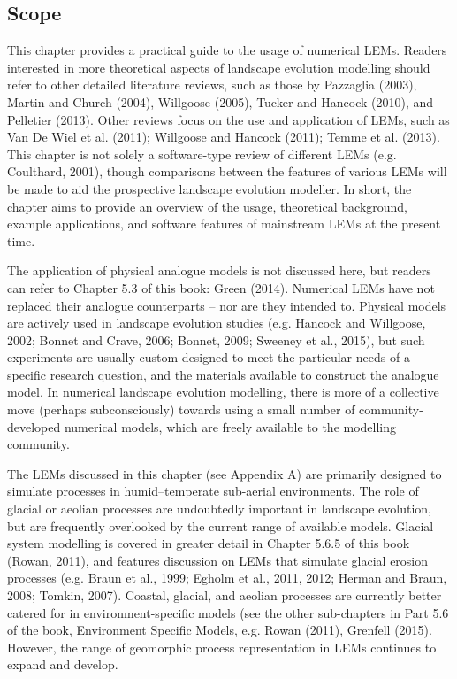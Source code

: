 \subsection[Scope]{Scope}
This chapter provides a practical guide to the usage of numerical LEMs. Readers interested in more theoretical aspects of landscape evolution modelling should refer to other detailed literature reviews, such as those by Pazzaglia (2003), Martin and Church (2004), Willgoose (2005), Tucker and Hancock (2010), and Pelletier (2013). Other reviews focus on the use and application of LEMs, such as Van De Wiel et al. (2011); Willgoose and Hancock (2011); Temme et al. (2013). This chapter is not solely a software-type review of different LEMs (e.g. Coulthard, 2001), though comparisons between the features of various LEMs will be made to aid the prospective landscape evolution modeller. In short, the chapter aims to provide an overview of the usage, theoretical background, example applications, and software features of mainstream LEMs at the present time.

The application of physical analogue models is not discussed here, but readers can refer to Chapter 5.3 of this book: Green (2014). Numerical LEMs have not replaced their analogue counterparts – nor are they intended to. Physical models are actively used in landscape evolution studies (e.g. Hancock and Willgoose, 2002; Bonnet and Crave, 2006; Bonnet, 2009; Sweeney et al., 2015), but such experiments are usually custom-designed to meet the particular needs of a specific research question, and the materials available to construct the analogue model. In numerical landscape evolution modelling, there is more of a collective move (perhaps subconsciously) towards using a small number of community-developed numerical models, which are freely available to the modelling community.

The LEMs discussed in this chapter (see Appendix A) are primarily designed to simulate processes in humid–temperate sub-aerial environments. The role of glacial or aeolian processes are undoubtedly important in landscape evolution, but are frequently overlooked by the current range of available models. Glacial system modelling is covered in greater detail in Chapter 5.6.5 of this book (Rowan, 2011), and features discussion on LEMs that simulate glacial erosion processes (e.g. Braun et al., 1999; Egholm et al., 2011, 2012; Herman and Braun, 2008; Tomkin, 2007). Coastal, glacial, and aeolian processes are currently better catered for in environment-specific models (see the other sub-chapters in Part 5.6 of the book, Environment Specific Models, e.g. Rowan (2011), Grenfell (2015). However, the range of geomorphic process representation in LEMs continues to expand and develop.

